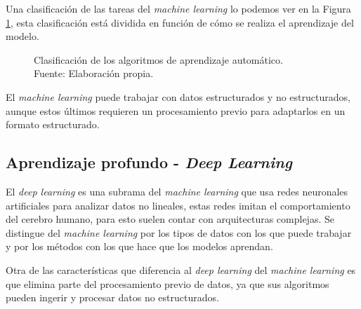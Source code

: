 Una clasificación de las tareas del \textit{machine learning} lo podemos ver en la Figura \ref{fig:machine-learning}, esta clasificación está dividida en función de cómo se realiza el aprendizaje del modelo.

\begin{figure}[H]
    \centering
    \centerline{}
    \caption{Clasificación de los algoritmos de aprendizaje automático.\\Fuente: Elaboración propia.}
    \label{fig:machine-learning}
\end{figure}

El \textit{machine learning} puede trabajar con datos estructurados y no estructurados, aunque estos últimos requieren un procesamiento previo para adaptarlos en un formato estructurado.



\subsection{Aprendizaje profundo - \textit{Deep Learning}}

El \textit{deep learning} es una subrama del \textit{machine learning} que usa redes neuronales artificiales para analizar datos no lineales, estas redes imitan el comportamiento del cerebro humano, para esto suelen contar con arquitecturas complejas.
Se distingue del \textit{machine learning} por los tipos de datos con los que puede trabajar y por los métodos con los que hace que los modelos aprendan.

Otra de las características que diferencia al \textit{deep learning} del \textit{machine learning} es que elimina parte del procesamiento previo de datos, ya que sus algoritmos pueden ingerir y procesar datos no estructurados.




